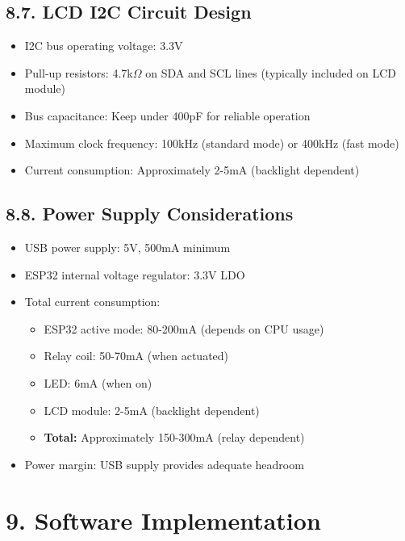 \documentclass[12pt]{article}
\begin{document}
\subsection*{8.7. LCD I2C Circuit Design}

\begin{itemize}
    \item I2C bus operating voltage: 3.3V
    \item Pull-up resistors: 4.7k$\Omega$ on SDA and SCL lines (typically included on LCD module)
    \item Bus capacitance: Keep under 400pF for reliable operation
    \item Maximum clock frequency: 100kHz (standard mode) or 400kHz (fast mode)
    \item Current consumption: Approximately 2-5mA (backlight dependent)
\end{itemize}

\subsection*{8.8. Power Supply Considerations}

\begin{itemize}
    \item USB power supply: 5V, 500mA minimum
    \item ESP32 internal voltage regulator: 3.3V LDO
    \item Total current consumption:
    \begin{itemize}
        \item ESP32 active mode: 80-200mA (depends on CPU usage)
        \item Relay coil: 50-70mA (when actuated)
        \item LED: 6mA (when on)
        \item LCD module: 2-5mA (backlight dependent)
        \item \textbf{Total:} Approximately 150-300mA (relay dependent)
    \end{itemize}
    \item Power margin: USB supply provides adequate headroom
\end{itemize}



\section*{9. Software Implementation}
\end{document}
